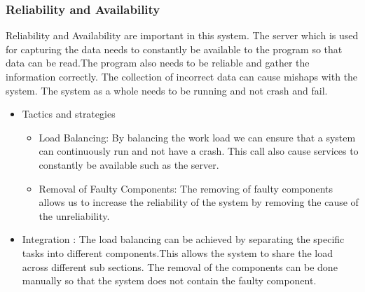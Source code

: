 \subsubsection{Reliability and Availability}	
\begin{flushleft}
Reliability and Availability are important in this system. The server which is used for capturing the data needs to constantly be available to the program so that data can be read.The program also needs to be reliable and gather the information correctly. The collection of incorrect data can cause mishaps with the system. The system as a whole needs to be running and not crash and fail.
\begin{itemize}
\item{Tactics and strategies}
\begin{itemize}
\item{Load Balancing}: By balancing the work load we can ensure that a system can continuously run and not have a crash. This call also cause services to constantly be available such as the server.
\item{Removal of Faulty Components}: The removing of faulty components allows us to increase the reliability of the system by removing the cause of the unreliability.
\end{itemize}

\item{Integration} :
The load balancing can be achieved by separating the specific tasks into different components.This allows the system to share the load across different sub sections. The removal of the components can be done manually so that the system does not contain the faulty component.
\end{itemize}

\end{flushleft}	
		
